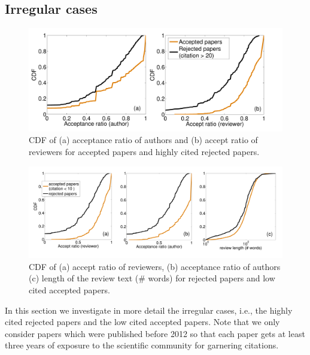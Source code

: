 \noindent
\subsection{Irregular cases}

\begin{figure}
\centering
\includegraphics[scale=0.17]{./texfiles/Chapter_4/jcdl/figures/highly_cited_rejected-eps-converted-to.pdf}
\caption{CDF of (a) acceptance ratio of authors and (b) accept ratio of reviewers for accepted papers and highly cited rejected papers.}
\label{fig10}
\vspace{3mm}
\end{figure}

\begin{figure}
\centering
\includegraphics[scale=0.17]{./texfiles/Chapter_4/jcdl/figures/low_cited_accepted-eps-converted-to.pdf}
\caption{CDF of (a) accept ratio of reviewers, (b) acceptance ratio of authors (c) length of the review text (\# words) for rejected papers and low cited accepted papers.}
\label{fig11}
\vspace{3mm}
\end{figure}



\label{irregular_cases}

In this section we investigate in more detail the irregular cases, i.e., the highly cited rejected papers and the low cited accepted papers. Note that we only consider papers which were published before 2012 so that each paper gets at least three years of exposure to the scientific community for garnering citations.


